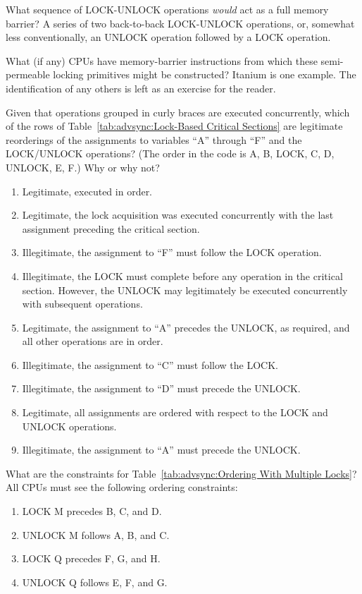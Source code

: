 \begin{enumerate}
\QuickQ{}
	What sequence of LOCK-UNLOCK operations \emph{would}
	act as a full memory barrier?
\QuickA{}
	A series of two back-to-back LOCK-UNLOCK operations, or, somewhat
	less conventionally, an UNLOCK operation followed by a LOCK
	operation.

\QuickQ{}
	What (if any) CPUs have memory-barrier instructions
	from which these semi-permeable locking primitives might
	be constructed?
\QuickA{}
	Itanium is one example.
	The identification of any others is left as an
	exercise for the reader.

\QuickQ{}
	Given that operations grouped in curly braces are executed
	concurrently, which of the rows of
	Table~\ref{tab:advsync:Lock-Based Critical Sections}
	are legitimate reorderings of the assignments to variables
	``A'' through ``F'' and the LOCK/UNLOCK operations?
	(The order in the code is A, B, LOCK, C, D, UNLOCK, E, F.)
	Why or why not?
\QuickA{}
	\begin{enumerate}
	\item	Legitimate, executed in order.
	\item	Legitimate, the lock acquisition was executed concurrently
		with the last assignment preceding the critical section.
	\item	Illegitimate, the assignment to ``F'' must follow the LOCK
		operation.
	\item	Illegitimate, the LOCK must complete before any operation in
		the critical section.  However, the UNLOCK may legitimately
		be executed concurrently with subsequent operations.
	\item	Legitimate, the assignment to ``A'' precedes the UNLOCK,
		as required, and all other operations are in order.
	\item	Illegitimate, the assignment to ``C'' must follow the LOCK.
	\item	Illegitimate, the assignment to ``D'' must precede the UNLOCK.
	\item	Legitimate, all assignments are ordered with respect to the
		LOCK and UNLOCK operations.
	\item	Illegitimate, the assignment to ``A'' must precede the UNLOCK.
	\end{enumerate}

\QuickQ{}
	What are the constraints for
	Table~\ref{tab:advsync:Ordering With Multiple Locks}?
\QuickA{}
	All CPUs must see the following ordering constraints:
	\begin{enumerate}
	\item	LOCK M precedes B, C, and D.
	\item	UNLOCK M follows A, B, and C.
	\item	LOCK Q precedes F, G, and H.
	\item	UNLOCK Q follows E, F, and G.
	\end{enumerate}


\end{enumerate}
